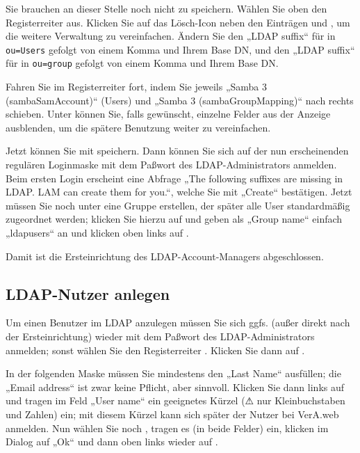 Sie brauchen an dieser Stelle noch nicht zu speichern. Wählen Sie oben
den Registerreiter  aus. Klicken
Sie auf das Lösch-Icon  neben den Einträgen
 und , um die weitere Verwaltung zu vereinfachen. Ändern Sie
den „LDAP suffix“ für  in \texttt{ou=Users}
gefolgt von einem Komma und Ihrem Base DN, und den „LDAP suffix“ für
 in \texttt{ou=group} gefolgt von einem
Komma und Ihrem Base DN.

Fahren Sie im Registerreiter  fort,
indem Sie jeweils „Samba 3 (sambaSamAccount)“ (Users) und „Samba 3
(sambaGroupMapping)“ nach  rechts schieben.
Unter  können Sie, falls
gewünscht, einzelne Felder aus der Anzeige ausblenden, um die spätere
Benutzung weiter zu vereinfachen.

Jetzt können Sie mit  speichern. Dann können
Sie sich auf der nun erscheinenden regulären Loginmaske mit dem Paßwort
des LDAP-Administrators anmelden. Beim ersten Login erscheint eine
Abfrage „The following suffixes are missing in LDAP. LAM can create them
for you.“, welche Sie mit „Create“ bestätigen. Jetzt müssen Sie noch
unter  eine Gruppe erstellen, der später
alle User standardmäßig zugeordnet werden; klicken Sie hierzu auf
 und geben als „Group name“ einfach
„ldapusers“ an und klicken oben links auf .

Damit ist die Ersteinrichtung des LDAP-Account-Managers abgeschlossen.

\subsection{LDAP-Nutzer anlegen}\label{subsec:setup-lam-adduser}

Um einen Benutzer im LDAP anzulegen müssen Sie sich ggfs. (außer direkt
nach der Ersteinrichtung) wieder mit dem Paßwort des LDAP-Administrators
anmelden; sonst wählen Sie den Registerreiter .
Klicken Sie dann auf .

In der folgenden Maske müssen Sie mindestens den „Last Name“ ausfüllen;
die „Email address“ ist zwar keine Pflicht, aber sinnvoll.
Klicken Sie dann links auf  und tragen im Feld
„User name“ ein geeignetes Kürzel (⚠ nur Kleinbuchstaben und Zahlen) ein;
mit diesem Kürzel kann sich später der Nutzer bei VerA.web anmelden. Nun
wählen Sie noch , tragen es (in beide
Felder) ein, klicken im Dialog auf „Ok“ und dann oben links wieder auf
.


